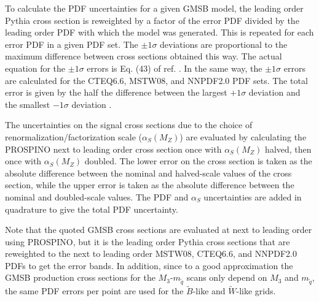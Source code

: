 \documentclass[dissertation.tex]{subfiles}
\begin{document}
To calculate the PDF uncertainties for a given GMSB model, the leading order Pythia cross section is reweighted by a factor of the error PDF divided by the leading order PDF with which the model was generated.  This is repeated for each error PDF in a given PDF set.  The $\pm1\sigma$ deviations are proportional to the maximum difference between cross sections obtained this way.  The actual equation for the $\pm1\sigma$ errors is Eq. (43) of ref. \cite{0034-4885-70-1-R02}.  In the same way, the $\pm1\sigma$ errors are calculated for the CTEQ6.6, MSTW08, and NNPDF2.0 PDF sets.  The total error is given by the half the difference between the largest $+1\sigma$ deviation and the smallest $-1\sigma$ deviation \cite{PDF4LHC1,PDF4LHC2,PDF4LHC3}.

The uncertainties on the signal cross sections due to the choice of renormalization/factorization scale ($\alpha_{S}(M_{Z})$) are evaluated by calculating the PROSPINO next to leading order cross section once with $\alpha_{S}(M_{Z})$ halved, then once with $\alpha_{S}(M_{Z})$ doubled.  The lower error on the cross section is taken as the absolute difference between the nominal and halved-scale values of the cross section, while the upper error is taken as the absolute difference between the nominal and doubled-scale values.  The PDF and $\alpha_{S}$ uncertainties are added in quadrature to give the total PDF uncertainty.

Note that the quoted GMSB cross sections are evaluated at next to leading order using PROSPINO, but it is the leading order Pythia cross sections that are reweighted to the next to leading order MSTW08, CTEQ6.6, and NNPDF2.0 PDFs to get the error bands.  In addition, since to a good approximation the GMSB production cross sections for the $M_{3}$-$m_{\tilde{q}}$ scans only depend on $M_{3}$ and $m_{\tilde{q}}$, the same PDF errors per point are used for the $\tilde{B}$-like and $\tilde{W}$-like grids.
\end{document}
